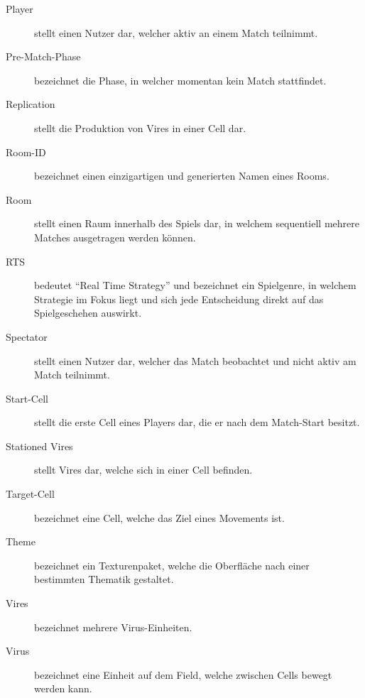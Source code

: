 \begin{description}
	\item[Player] stellt einen Nutzer dar, welcher aktiv an einem Match teilnimmt.
	\item[Pre-Match-Phase] bezeichnet die Phase, in welcher momentan kein Match stattfindet.
	\item[Replication] stellt die Produktion von Vires in einer Cell dar.
	\item[Room-ID] bezeichnet einen einzigartigen und generierten Namen eines Rooms.
	\item[Room] stellt einen Raum innerhalb des Spiels dar, in welchem sequentiell mehrere Matches ausgetragen werden können.
	\item[RTS] bedeutet ``Real Time Strategy'' und bezeichnet ein Spielgenre, in welchem Strategie im Fokus liegt und sich jede Entscheidung direkt auf das Spielgeschehen auswirkt.
	\item[Spectator] stellt einen Nutzer dar, welcher das Match beobachtet und nicht aktiv am Match teilnimmt.
	\item[Start-Cell] stellt die erste Cell eines Players dar, die er nach dem Match-Start besitzt.
	\item[Stationed Vires] stellt Vires dar, welche sich in einer Cell befinden.
	\item[Target-Cell] bezeichnet eine Cell, welche das Ziel eines Movements ist.
	\item[Theme] bezeichnet ein Texturenpaket, welche die Oberfläche nach einer bestimmten Thematik gestaltet.
	\item[Vires] bezeichnet mehrere Virus-Einheiten.
	\item[Virus] bezeichnet eine Einheit auf dem Field, welche zwischen Cells bewegt werden kann.
\end{description}